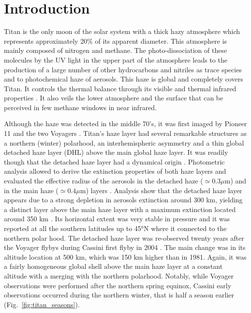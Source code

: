 \section{Introduction}

Titan is the only moon of the solar system with a thick hazy atmosphere which represents approximately 20\% of its apparent
diameter. This atmosphere is mainly composed of nitrogen and methane. The photo-dissociation of these molecules by the
UV light in the upper part of the atmosphere leads to the production of a large number of other hydrocarbons and nitriles as
trace species and to photochemical haze of aerosols. This haze is global and completely covers Titan. It controls
the thermal balance through its visible and thermal infrared properties \citep[e.g.][]{Bezard2018}.
It also veils the lower atmosphere and the surface that can be perceived in few methane windows in near infrared.

Although the haze was detected in the middle 70's, it was first imaged by Pioneer 11 \citep{Smith1980} and the two Voyagers
\citep{Smith1981, Smith1982, Sromovsky1981}. Titan's haze layer had several remarkable structures as a northern (winter)
polarhood, an interhemispheric asymmetry and a thin global detached haze layer (DHL) above the main global haze layer. It was
readily though that the detached haze layer had a dynamical origin \citep{Smith1981}. Photometric analysis allowed
to derive the extinction properties of both haze layers and evaluated the effective radius of the aerosols in the detached
haze ($\simeq 0.3 \mu$m) and in the main haze ($\simeq 0.4 \mu$m) layers \citep{Rages1983, Rages1983a}. Analysis show
that the detached haze layer appears due to a strong depletion in aerosols extinction around 300 km, yielding a distinct
layer above the main haze layer with a maximum extinction located around 350 km \citep{Rages1983}. Its horizontal extent was
very stable in pressure and it was reported at all the southern latitudes up to \ang{45}N where it connected to the northern
polar hood. The detached haze layer was re-observed twenty years after the Voyager flybys during Cassini first flyby in 2004
\citep{Porco2005}. The main change was in its altitude location at 500 km, which was 150 km higher than in 1981.
Again, it was a fairly homogeneous global shell above the main haze layer at a constant altitude with a
merging with the northern polarhood. Notably, while Voyager observations were performed after the northern spring equinox,
Cassini early observations occurred during the northern winter, that is half a season earlier (Fig.~\ref{fig:titan_seasons}).

